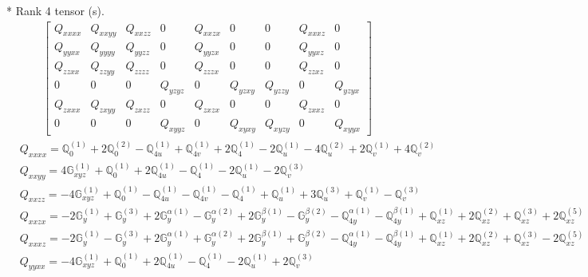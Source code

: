 \documentclass[fleqn,8pt,landscape]{jsarticle}
\begin{document}
* Rank 4 tensor (s).
\begin{align*}
\begin{bmatrix} Q_{xxxx} & Q_{xxyy} & Q_{xxzz} & 0 & Q_{xxzx} & 0 & 0 & Q_{xxxz} & 0 \\ Q_{yyxx} & Q_{yyyy} & Q_{yyzz} & 0 & Q_{yyzx} & 0 & 0 & Q_{yyxz} & 0 \\ Q_{zzxx} & Q_{zzyy} & Q_{zzzz} & 0 & Q_{zzzx} & 0 & 0 & Q_{zzxz} & 0 \\ 0 & 0 & 0 & Q_{yzyz} & 0 & Q_{yzxy} & Q_{yzzy} & 0 & Q_{yzyx} \\ Q_{zxxx} & Q_{zxyy} & Q_{zxzz} & 0 & Q_{zxzx} & 0 & 0 & Q_{zxxz} & 0 \\ 0 & 0 & 0 & Q_{xyyz} & 0 & Q_{xyxy} & Q_{xyzy} & 0 & Q_{xyyx} \end{bmatrix}
\end{align*}
\begin{align*}
& Q_{xxxx} = \mathbb{Q}_{0}^{(1)} + 2 \mathbb{Q}_{0}^{(2)} - \mathbb{Q}_{4u}^{(1)} + \mathbb{Q}_{4v}^{(1)} + 2 \mathbb{Q}_{4}^{(1)} - 2 \mathbb{Q}_{u}^{(1)} - 4 \mathbb{Q}_{u}^{(2)} + 2 \mathbb{Q}_{v}^{(1)} + 4 \mathbb{Q}_{v}^{(2)} \\
& Q_{xxyy} = 4 \mathbb{G}_{xyz}^{(1)} + \mathbb{Q}_{0}^{(1)} + 2 \mathbb{Q}_{4u}^{(1)} - \mathbb{Q}_{4}^{(1)} - 2 \mathbb{Q}_{u}^{(1)} - 2 \mathbb{Q}_{v}^{(3)} \\
& Q_{xxzz} = - 4 \mathbb{G}_{xyz}^{(1)} + \mathbb{Q}_{0}^{(1)} - \mathbb{Q}_{4u}^{(1)} - \mathbb{Q}_{4v}^{(1)} - \mathbb{Q}_{4}^{(1)} + \mathbb{Q}_{u}^{(1)} + 3 \mathbb{Q}_{u}^{(3)} + \mathbb{Q}_{v}^{(1)} - \mathbb{Q}_{v}^{(3)} \\
& Q_{xxzx} = - 2 \mathbb{G}_{y}^{(1)} + \mathbb{G}_{y}^{(3)} + 2 \mathbb{G}_{y}^{\alpha(1)} - \mathbb{G}_{y}^{\alpha(2)} + 2 \mathbb{G}_{y}^{\beta(1)} - \mathbb{G}_{y}^{\beta(2)} - \mathbb{Q}_{4y}^{\alpha(1)} - \mathbb{Q}_{4y}^{\beta(1)} + \mathbb{Q}_{xz}^{(1)} + 2 \mathbb{Q}_{xz}^{(2)} + \mathbb{Q}_{xz}^{(3)} + 2 \mathbb{Q}_{xz}^{(5)} \\
& Q_{xxxz} = - 2 \mathbb{G}_{y}^{(1)} - \mathbb{G}_{y}^{(3)} + 2 \mathbb{G}_{y}^{\alpha(1)} + \mathbb{G}_{y}^{\alpha(2)} + 2 \mathbb{G}_{y}^{\beta(1)} + \mathbb{G}_{y}^{\beta(2)} - \mathbb{Q}_{4y}^{\alpha(1)} - \mathbb{Q}_{4y}^{\beta(1)} + \mathbb{Q}_{xz}^{(1)} + 2 \mathbb{Q}_{xz}^{(2)} + \mathbb{Q}_{xz}^{(3)} - 2 \mathbb{Q}_{xz}^{(5)} \\
& Q_{yyxx} = - 4 \mathbb{G}_{xyz}^{(1)} + \mathbb{Q}_{0}^{(1)} + 2 \mathbb{Q}_{4u}^{(1)} - \mathbb{Q}_{4}^{(1)} - 2 \mathbb{Q}_{u}^{(1)} + 2 \mathbb{Q}_{v}^{(3)} \\

\end{align*}
\end{document}
